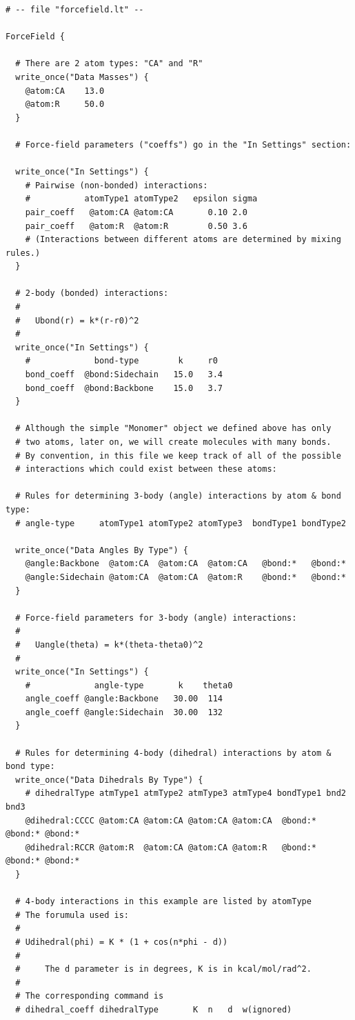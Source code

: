 \documentclass[11pt]{article}
\begin{document}
\begin{verbatim}
# -- file "forcefield.lt" --

ForceField {

  # There are 2 atom types: "CA" and "R"
  write_once("Data Masses") {
    @atom:CA    13.0
    @atom:R     50.0
  }

  # Force-field parameters ("coeffs") go in the "In Settings" section:

  write_once("In Settings") {
    # Pairwise (non-bonded) interactions:
    #           atomType1 atomType2   epsilon sigma
    pair_coeff   @atom:CA @atom:CA       0.10 2.0
    pair_coeff   @atom:R  @atom:R        0.50 3.6
    # (Interactions between different atoms are determined by mixing rules.)
  }

  # 2-body (bonded) interactions:
  #
  #   Ubond(r) = k*(r-r0)^2
  #
  write_once("In Settings") {
    #             bond-type        k     r0
    bond_coeff  @bond:Sidechain   15.0   3.4
    bond_coeff  @bond:Backbone    15.0   3.7
  }

  # Although the simple "Monomer" object we defined above has only
  # two atoms, later on, we will create molecules with many bonds.
  # By convention, in this file we keep track of all of the possible
  # interactions which could exist between these atoms:

  # Rules for determining 3-body (angle) interactions by atom & bond type:
  # angle-type     atomType1 atomType2 atomType3  bondType1 bondType2

  write_once("Data Angles By Type") {
    @angle:Backbone  @atom:CA  @atom:CA  @atom:CA   @bond:*   @bond:*
    @angle:Sidechain @atom:CA  @atom:CA  @atom:R    @bond:*   @bond:*
  }

  # Force-field parameters for 3-body (angle) interactions:
  #
  #   Uangle(theta) = k*(theta-theta0)^2
  #
  write_once("In Settings") {
    #             angle-type       k    theta0
    angle_coeff @angle:Backbone   30.00  114
    angle_coeff @angle:Sidechain  30.00  132
  }

  # Rules for determining 4-body (dihedral) interactions by atom & bond type:
  write_once("Data Dihedrals By Type") {
    # dihedralType atmType1 atmType2 atmType3 atmType4 bondType1 bnd2   bnd3
    @dihedral:CCCC @atom:CA @atom:CA @atom:CA @atom:CA  @bond:* @bond:* @bond:*
    @dihedral:RCCR @atom:R  @atom:CA @atom:CA @atom:R   @bond:* @bond:* @bond:*
  }

  # 4-body interactions in this example are listed by atomType
  # The forumula used is:
  #
  # Udihedral(phi) = K * (1 + cos(n*phi - d))
  #
  #     The d parameter is in degrees, K is in kcal/mol/rad^2.
  #
  # The corresponding command is 
  # dihedral_coeff dihedralType       K  n   d  w(ignored)


\end{verbatim}
\end{document}
